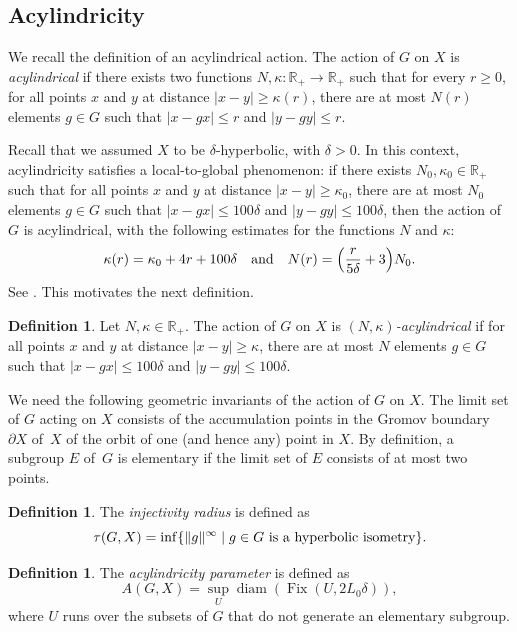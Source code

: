\documentclass[11pt]{article}
\theoremstyle{plain}
\theoremstyle{definition}
\newtheorem{df}[thm]{Definition}
\DeclareMathOperator{\diam}{diam}
\DeclareMathOperator{\Fix}{Fix}
\begin{document}
\subsection{Acylindricity} We recall the definition of an acylindrical action.
The action of $G$ on $X$ is \emph{acylindrical} if there exists two functions $N,\kappa \colon \mathbb R_+ \to \mathbb R_+$ such that for every $r \geq 0$, for all points $x$ and $y$ at distance $|x-y|\geqslant \kappa(r)$, there are at most $N(r)$ elements $g\in G$ such that $|x-gx|\leqslant r$ and $|y-gy|\leqslant r$.

Recall that we assumed $X$ to be $\delta$-hyperbolic, with $\delta > 0$.
In this context, acylindricity satisfies a local-to-global phenomenon: if there exists $N_0,\kappa_0 \in \mathbb R_+$ such that for all points $x$ and $y$ at distance $|x-y|\geqslant \kappa_0$, there are at most $N_0$ elements $g\in G$ such that $|x-gx|\leqslant 100\delta$ and $|y-gy|\leqslant 100\delta$, then the action of $G$ is acylindrical, with the following estimates for the functions $N$ and $\kappa$:
\begin{equation}
\label{eqn: local-global acyl}
\kappa(r) = \kappa_0 + 4r + 100\delta
\quad \text{and} \quad
N(r) = \Bigl( \frac r{5\delta} + 3\Bigr)N_0.
\end{equation}
See \cite[Prop.\,5.31]{dahmani_hyperbolically_2017}.
This motivates the next definition.

\begin{df}\label{D: acylindrical}
Let $N, \kappa \in \mathbb R_+$.
The action of $G$ on $X$ is \emph{$(N,\kappa)$-acylindrical} if for all points $x$ and $y$ at distance $|x-y|\geqslant \kappa$, there are at most $N$ elements $g\in G$ such that $|x-gx|\leqslant 100 \delta$ and $|y-gy|\leqslant 100 \delta$.
\end{df}

We need the following geometric invariants of the action of $G$ on $X$.
The limit set of $G$ acting on $X$ consists of the accumulation points in the Gromov boundary $\partial X$ of~$X$ of the orbit of one (and hence any) point in $X$. By definition, a subgroup $E$ of~$G$ is {elementary} if the limit set of $E$ consists of at most two points.

\begin{df} The \emph{injectivity radius} is defined as
\[
\tau(G,X)=\inf \{\| g \|^{\infty} \mid g \in G \hbox{ is a hyperbolic isometry}\}.
\]
\end{df}

\begin{df} The \emph{acylindricity parameter} is defined as
\[
A(G,X)=\sup_{U} \diam( \Fix(U,2L_0\delta)),
\]
where $U$ runs over the subsets of $G$ that do not generate an elementary subgroup.
\end{df}
\end{document}
